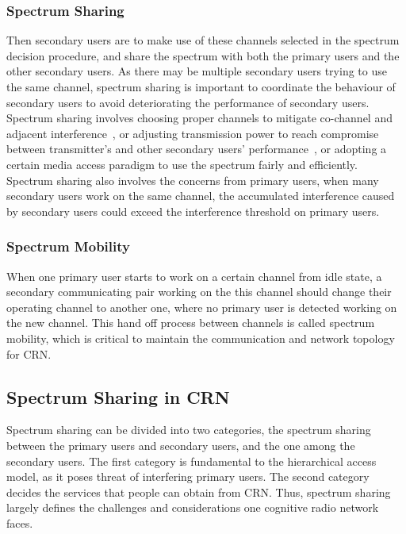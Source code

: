 \subsubsection{Spectrum Sharing}
Then secondary users are to make use of these channels selected in the spectrum decision procedure, and share the spectrum with both the primary users and the other secondary users.
As there may be multiple secondary users trying to use the same channel, spectrum sharing is important to coordinate the behaviour of secondary users to avoid deteriorating the performance of secondary users.
Spectrum sharing involves choosing proper channels to mitigate co-channel and adjacent interference~\cite{ca_crn_survey_2013}, or adjusting transmission power to reach compromise between transmitter's and other secondary users' performance~\cite{pa_crn_survey_2012}, or adopting a certain media access paradigm to use the spectrum fairly and efficiently.
Spectrum sharing also involves the concerns from primary users, \ie when many secondary users work on the same channel, the accumulated interference caused by secondary users could exceed the interference threshold on primary users.


\subsubsection{Spectrum Mobility}
When one primary user starts to work on a certain channel from idle state, a secondary communicating pair working on the this channel should change their operating channel to another one, where no primary user is detected working on the new channel.
This hand off process between channels is called spectrum mobility, which is critical to maintain the communication and network topology for CRN.  





\subsection{Spectrum Sharing in CRN}
\label{spectrum_sharing}
Spectrum sharing can be divided into two categories, the spectrum sharing between the primary users and secondary users, and the one among the secondary users.
The first category is fundamental to the hierarchical access model, as it poses threat of interfering primary users.
The second category decides the services that people can obtain from CRN.
Thus, spectrum sharing largely defines the challenges and considerations one cognitive radio network faces.


